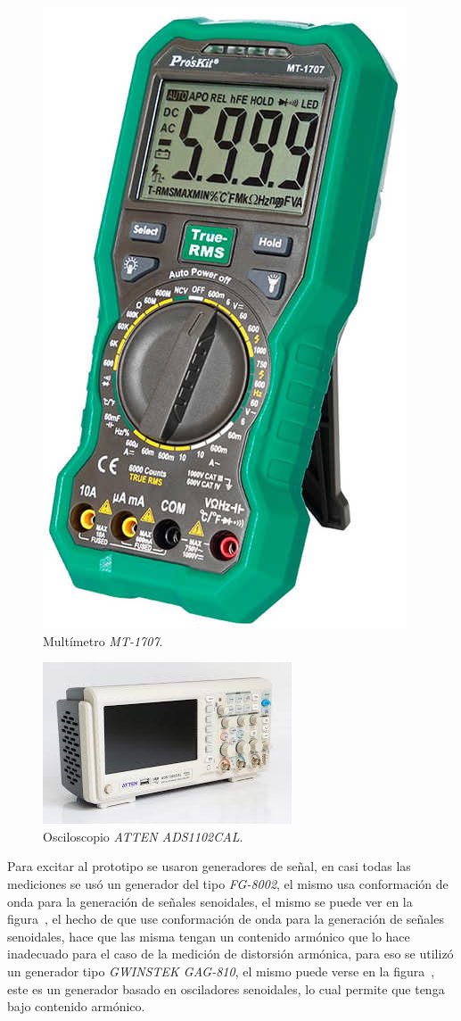 \begin{figure}[H]
    \centering
    \includegraphics[width=0.5 \textwidth]{./img/instrumentos/MT_1707.png}
    \caption{Multímetro \textit{MT-1707}.}
    \label{fig:multimeter_lab}
\end{figure}


\begin{figure}[H]
    \centering
    \includegraphics[width=0.5 \textwidth]{./img/instrumentos/ATTEN_ADS1102CAL.png}
    \caption{Osciloscopio \textit{ATTEN ADS1102CAL}.}
    \label{fig:osciloscope_lab}
\end{figure}


Para excitar al prototipo se usaron generadores de señal, en casi todas las mediciones se usó un generador del tipo \textit{FG-8002}, el mismo usa conformación de onda para la generación de señales senoidales, el mismo se puede ver en la figura~, el hecho de que use conformación de onda para la generación de señales senoidales, hace que las misma tengan un contenido armónico que lo hace inadecuado para el caso de la medición de distorsión armónica, para eso se utilizó un generador tipo \textit{GWINSTEK GAG-810}, el mismo puede verse en la figura~, este es un generador basado en osciladores senoidales, lo cual permite que tenga bajo contenido armónico.


